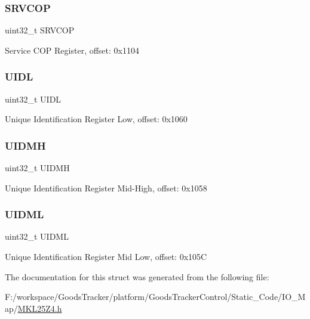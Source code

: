 \subsubsection{\texorpdfstring{S\+R\+V\+C\+OP}{SRVCOP}}
{\footnotesize\ttfamily uint32\+\_\+t S\+R\+V\+C\+OP}

Service C\+OP Register, offset\+: 0x1104 \mbox{\label{struct_s_i_m___mem_map_a339fceb110e65a719f4566c52270be8e}} 
\subsubsection{\texorpdfstring{U\+I\+DL}{UIDL}}
{\footnotesize\ttfamily uint32\+\_\+t U\+I\+DL}

Unique Identification Register Low, offset\+: 0x1060 \mbox{\label{struct_s_i_m___mem_map_a599672d7e15a6f7a2b774a3b06e0e9cc}} 
\subsubsection{\texorpdfstring{U\+I\+D\+MH}{UIDMH}}
{\footnotesize\ttfamily uint32\+\_\+t U\+I\+D\+MH}

Unique Identification Register Mid-\/\+High, offset\+: 0x1058 \mbox{\label{struct_s_i_m___mem_map_ac0ca2251290fdadcaf84fbe3a7534b6d}} 
\subsubsection{\texorpdfstring{U\+I\+D\+ML}{UIDML}}
{\footnotesize\ttfamily uint32\+\_\+t U\+I\+D\+ML}

Unique Identification Register Mid Low, offset\+: 0x105C 

The documentation for this struct was generated from the following file\+:\begin{DoxyCompactItemize}
\item 
F\+:/workspace/\+Goods\+Tracker/platform/\+Goods\+Tracker\+Control/\+Static\+\_\+\+Code/\+I\+O\+\_\+\+Map/\hyperlink{_m_k_l25_z4_8h}{M\+K\+L25\+Z4.\+h}\end{DoxyCompactItemize}
